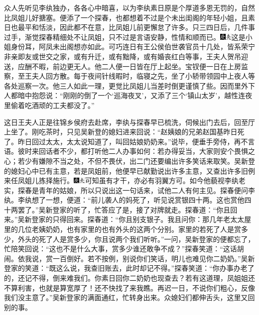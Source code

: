 众人先听见李纨独办，各各心中暗喜，以为李纨素日原是个厚道多恩无罚的，自然比凤姐儿好搪塞。便添了一个探春，也都想着不过是个未出闺阁的年轻小姐，且素日也最平和恬淡，因此都不在意，比凤姐儿前更懈怠了许多。只三四日后，几件事过手，渐觉探春精细处不让凤姐，只不过是言语安静，性情和顺而已。{\includegraphics[width=3mm]{../Images/00004}\includegraphics[width=3mm]{../Images/00012}\footnotesize \kaishu 这是小姐身份耳，阿凤未出阁想亦如此。}可巧连日有王公侯伯世袭官员十几处，皆系荣宁非亲即友或世交之家，或有升迁，或有黜降，或有婚丧红白等事，王夫人贺吊迎送，应酬不暇，前边更无人。他二人便一日皆在厅上起坐。宝钗便一日在上房监察，至王夫人回方散。每于夜间针线暇时，临寝之先，坐了小轿带领园中上夜人等各处巡察一次。他三人如此一理，更觉比凤姐儿当差时倒更谨慎了些。因而里外下人都暗中抱怨说：“刚刚的倒了一个‘巡海夜叉’，又添了三个‘镇山太岁’，越性连夜里偷着吃酒顽的工夫都没了。”

这日王夫人正是往锦乡侯府去赴席，李纨与探春早已梳洗，伺候出门去后，回至厅上坐了。刚吃茶时，只见吴新登的媳妇进来回说：“赵姨娘的兄弟赵国基昨日死了。昨日回过太太，太太说知道了，叫回姑娘奶奶来。”说毕，便垂手旁侍，再不言语。彼时来回话者不少，都打听他二人办事如何：若办得妥当，大家则安个畏惧之心；若少有嫌隙不当之处，不但不畏伏，出二门还要编出许多笑话来取笑。吴新登的媳妇心中已有主意，若是凤姐前，他便早已献勤说出许多主意，又查出许多旧例来任凤姐儿拣择施行。{\includegraphics[width=3mm]{../Images/00004}\includegraphics[width=3mm]{../Images/00012}\footnotesize \kaishu 可知虽有才干，亦必有羽翼方可。}如今他藐视李纨老实，探春是青年的姑娘，所以只说出这一句话来，试他二人有何主见。探春便问李纨。李纨想了一想，便道：“前儿袭人的妈死了，听见说赏银四十两。这也赏他四十两罢了。”吴新登家的听了，忙答应了是，接了对牌就走。探春道：“你且回来。”吴新登家的只得回来。探春道：“你且别支银子。我且问你：那几年老太太屋里的几位老姨奶奶，也有家里的也有外头的这两个分别。家里的若死了人是赏多少，外头的死了人是赏多少，你且说两个我们听听。”一问，吴新登家的便都忘了，忙陪笑回说：“这也不是什么大事，赏多少谁还敢争不成？”探春笑道：“这话胡闹。依我说，赏一百倒好。若不按例，别说你们笑话，明儿也难见你二奶奶。”吴新登家的笑道：“既这么说，我查旧账去，此时却记不得。”探春笑道：“你办事办老了的，还记不得，倒来难我们。你素日回你二奶奶也现查去？若有这道理，凤姐姐还不算利害，也就是算宽厚了！还不快找了来我瞧。再迟一日，不说你们粗心，反像我们没主意了。”吴新登家的满面通红，忙转身出来。众媳妇们都伸舌头，这里又回别的事。

